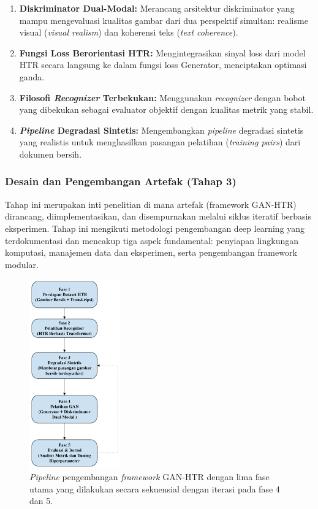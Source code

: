 \documentclass[12pt,a4paper]{article}
\begin{document}
\begin{enumerate}[leftmargin=*, nosep]
\item \textbf{Diskriminator Dual-Modal:} Merancang arsitektur diskriminator yang mampu mengevaluasi kualitas gambar dari dua perspektif simultan: realisme visual (\textit{visual realism}) dan koherensi teks (\textit{text coherence}).

\item \textbf{Fungsi Loss Berorientasi HTR:} Mengintegrasikan sinyal loss dari model HTR secara langsung ke dalam fungsi loss Generator, menciptakan optimasi ganda.

\item \textbf{Filosofi \textit{Recognizer} Terbekukan:} Menggunakan \textit{recognizer} dengan bobot yang dibekukan sebagai evaluator objektif dengan kualitas metrik yang stabil.

\item \textbf{\textit{Pipeline} Degradasi Sintetis:} Mengembangkan \textit{pipeline} degradasi sintetis yang realistis untuk menghasilkan pasangan pelatihan (\textit{training pairs}) dari dokumen bersih.
\end{enumerate}

\subsubsection{Desain dan Pengembangan Artefak (Tahap 3)}
Tahap ini merupakan inti penelitian di mana artefak (framework GAN-HTR) dirancang, diimplementasikan, dan disempurnakan melalui siklus iteratif berbasis eksperimen. Tahap ini mengikuti metodologi pengembangan deep learning yang terdokumentasi dan mencakup tiga aspek fundamental: penyiapan lingkungan komputasi, manajemen data dan eksperimen, serta pengembangan framework modular.

\begin{figure}[htbp]
\centering
\includegraphics[width=0.35\textwidth]{images/PengembanganArtefak.png}
\caption{\textit{Pipeline} pengembangan \textit{framework} GAN-HTR dengan lima fase utama yang dilakukan secara sekuensial dengan iterasi pada fase 4 dan 5.}
\label{fig:development-pipeline}
\end{figure}
\end{document}
